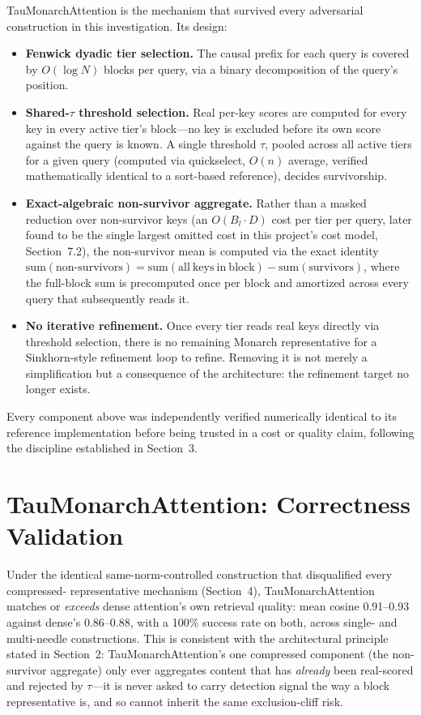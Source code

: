 \documentclass[11pt]{article}
\begin{document}
TauMonarchAttention is the mechanism that survived every adversarial construction in this
investigation. Its design:

\begin{itemize}[leftmargin=1.3em]
\item \textbf{Fenwick dyadic tier selection.} The causal prefix for each query is covered by
$O(\log N)$ blocks per query, via a binary decomposition of the query's position.
\item \textbf{Shared-$\tau$ threshold selection.} Real per-key scores are computed for every key
in every active tier's block---no key is excluded before its own score against the query
is known. A single threshold $\tau$, pooled across all active tiers for a given query
(computed via quickselect, $O(n)$ average, verified mathematically identical to a
sort-based reference), decides survivorship.
\item \textbf{Exact-algebraic non-survivor aggregate.} Rather than a masked reduction over
non-survivor keys (an $O(B_l \cdot D)$ cost per tier per query, later found to be
the single largest omitted cost in this project's cost model, Section~7.2), the
non-survivor mean is computed via the exact identity
$\mathrm{sum(non\text{-}survivors)} = \mathrm{sum(all\ keys\ in\ block)} - \mathrm{sum(survivors)}$,
where the full-block sum is precomputed once per block and amortized across every query
that subsequently reads it.
\item \textbf{No iterative refinement.} Once every tier reads real keys directly via threshold
selection, there is no remaining Monarch representative for a Sinkhorn-style refinement
loop to refine. Removing it is not merely a simplification but a consequence of the
architecture: the refinement target no longer exists.
\end{itemize}

Every component above was independently verified numerically identical to its reference
implementation before being trusted in a cost or quality claim, following the discipline
established in Section~3.

\section{TauMonarchAttention: Correctness Validation}

Under the identical same-norm-controlled construction that disqualified every compressed-
representative mechanism (Section~4), TauMonarchAttention matches or \emph{exceeds}
dense attention's own retrieval quality: mean cosine 0.91--0.93 against dense's 0.86--0.88,
with a 100\% success rate on both, across single- and multi-needle constructions. This is
consistent with the architectural principle stated in Section~2: TauMonarchAttention's
one compressed component (the non-survivor aggregate) only ever aggregates content that
has \emph{already} been real-scored and rejected by $\tau$---it is never asked to carry
detection signal the way a block representative is, and so cannot inherit the same
exclusion-cliff risk.
\end{document}
